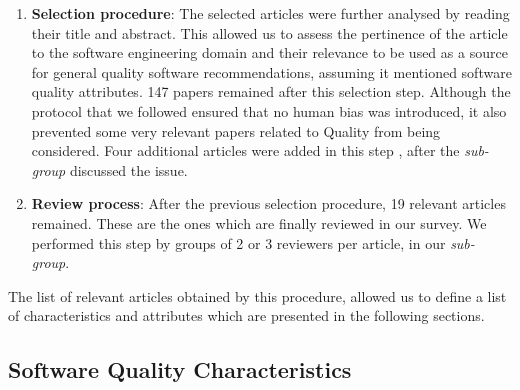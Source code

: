 \begin{enumerate}
    \item \textbf{Selection procedure}: The selected articles were further analysed by reading their title and abstract. This allowed us to assess the pertinence of the article to the software engineering domain and their relevance to be used as a source for general quality software recommendations, assuming it mentioned software quality attributes. 147 papers remained after this selection step. Although the protocol that we followed ensured that no human bias was introduced, it also prevented some very relevant papers related to Quality from being considered. Four additional articles were added in this step \cite{orviz_set_2017,orviz_fernandez_eosc-synergy_2020,raymond_software_2013,shepherdson_cessda_2019}, after the \textit{sub-group} discussed the issue.

    \item \textbf{Review process}: After the previous selection procedure, 19 relevant articles remained. These are the ones which are finally reviewed in our survey. We performed this step by groups of 2 or 3 reviewers per article, in our \textit{sub-group}.
\end{enumerate}


The list of relevant articles obtained by this procedure, allowed us to define a list of characteristics and attributes which are presented in the following sections.

\subsection{Software Quality Characteristics}
\label{subsect:sqchar}

